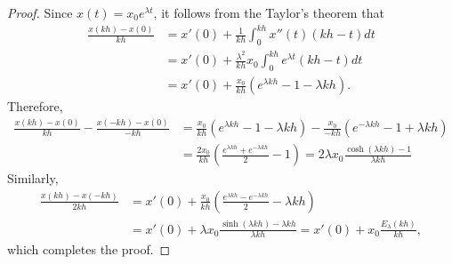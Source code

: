 \documentclass[10pt,a4paper]{amsart}
\begin{document}
\begin{proof}
    Since $x(t) = x_0e^{\lambda t}$,
    it follows from the Taylor's theorem that 
    \begin{align*}
        \frac{x(kh) - x(0)}{kh} &= x'(0) + \frac{1}{kh}\int_0^{kh} x''(t) (kh-t) dt \\
        &= x'(0) + \frac{\lambda^2}{kh} x_0 \int_0^{kh}  e^{\lambda t} (kh-t) dt \\
        &= x'(0) + \frac{x_0}{kh}(e^{\lambda kh}-1-\lambda kh).
    \end{align*}
    Therefore,
    \begin{align*}
        \frac{x(kh) - x(0)}{kh} - \frac{x(-kh) - x(0)}{-kh}
        &= \frac{x_0}{kh}(e^{\lambda kh}-1-\lambda kh) - \frac{x_0}{-kh}(e^{-\lambda kh}-1+\lambda kh) \\
        &= \frac{2x_0}{kh}(\frac{e^{\lambda kh}+e^{-\lambda kh}}{2}-1)
        = 2\lambda x_0 \frac{\cosh(\lambda kh)-1}{\lambda kh} 
    \end{align*}
    Similarly, 
    \begin{align*}
        \frac{x(kh)-x(-kh)}{2kh} &= x'(0) + \frac{x_0}{kh}(\frac{e^{\lambda kh}-e^{-\lambda kh}}{2}-\lambda kh) \\
        &= x'(0) + \lambda x_0\frac{\sinh(\lambda kh) - \lambda kh}{\lambda kh} 
        = x'(0) + x_0 \frac{E_\lambda(kh)}{kh},
    \end{align*}
    which completes the proof.  
\end{proof}
\end{document}
